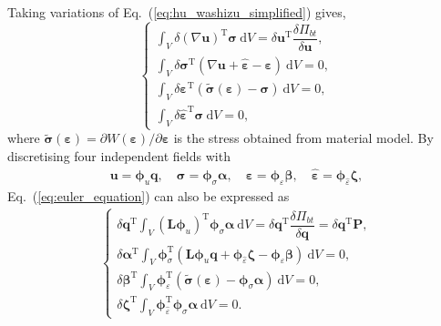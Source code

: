 \documentclass[3p,sort&compress,review,11pt]{elsarticle}
\newcommand*{\md}[1]{\mathrm{d}#1}
\newcommand*{\va}[1]{\delta#1}
\newcommand*{\mT}{\mathrm{T}}
\newcommand*{\vfrac}[2]{\dfrac{\va#1}{\va#2}}
\newcommand*{\eqsref}[1]{Eq.~(\ref{#1})}
\begin{document}
Taking variations of \eqsref{eq:hu_washizu_simplified} gives,
\begin{equation}\label{eq:euler_equation}
\left\{\begin{array}{l}
\displaystyle\int_V\va{\left(\nabla\mathbold{u}\right)}^\mT\mathbold{\sigma}~\md{V}=\va{\mathbold{u}}^\mT\vfrac{\varPi_{bt}}{\mathbold{u}},\\[3mm]
\displaystyle\int_V\va{\mathbold{\sigma}}^\mT\left(\nabla\mathbold{u}+\hat{\mathbold{\varepsilon}}-\mathbold{\varepsilon}\right)~\md{V}=0,\\[3mm]
\displaystyle\int_V\va{\mathbold{\varepsilon}}^\mT\left(\tilde{\mathbold{\sigma}}\left(\mathbold{\varepsilon}\right)-\mathbold{\sigma}\right)~\md{V}=0,\\[3mm]
\displaystyle\int_V\va{\hat{\mathbold{\varepsilon}}}^\mT\mathbold{\sigma}~\md{V}=0,
\end{array}\right.
\end{equation}
where $\tilde{\mathbold{\sigma}}\left(\mathbold{\varepsilon}\right)=\partial{}W\left(\mathbold{\varepsilon}\right)/\partial\mathbold{\varepsilon}$ is the stress obtained from material model. By discretising four independent fields with
\begin{gather*}
\mathbold{u}=\mathbold{\phi}_u\mathbold{q},\quad
\mathbold{\sigma}=\mathbold{\phi}_\sigma\mathbold{\alpha},\quad
\mathbold{\varepsilon}=\mathbold{\phi}_\varepsilon\mathbold{\beta},\quad
\hat{\mathbold{\varepsilon}}=\mathbold{\phi}_{\hat{\varepsilon}}\mathbold{\zeta},
\end{gather*}
\eqsref{eq:euler_equation} can also be expressed as
\begin{gather}\label{eq:discretised_euler_equation}
\left\{\begin{array}{l}
\displaystyle\va{\mathbold{q}^\mT}\int_V\left(\mathbold{L}\mathbold{\phi}_u\right)^\mT\mathbold{\phi}_\sigma\mathbold{\alpha}~\md{V}=\va{\mathbold{q}}^\mT\vfrac{\varPi_{bt}}{\mathbold{q}}=\va{\mathbold{q}}^\mT\mathbold{P},\\[3mm]
\displaystyle\va{\mathbold{\alpha}^\mT}\int_V\mathbold{\phi}_\sigma^\mT\left(\mathbold{L}\mathbold{\phi}_u\mathbold{q}+\mathbold{\phi}_{\hat{\varepsilon}}\mathbold{\zeta}-\mathbold{\phi}_\varepsilon\mathbold{\beta}\right)~\md{V}=0,\\[3mm]
\displaystyle\va{\mathbold{\beta}^\mT}\int_V\mathbold{\phi}_\varepsilon^\mT\left(\tilde{\mathbold{\sigma}}\left(\mathbold{\varepsilon}\right)-\mathbold{\phi}_\sigma\mathbold{\alpha}\right)~\md{V}=0,\\[3mm]
\displaystyle\va{\mathbold{\zeta}^\mT}\int_V\mathbold{\phi}_{\hat{\varepsilon}}^\mT\mathbold{\phi}_\sigma\mathbold{\alpha}~\md{V}=0.
\end{array}\right.
\end{gather}
\end{document}
